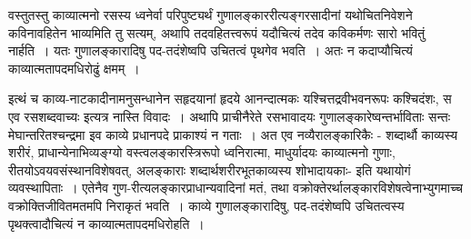 {वस्तुतस्तु काव्यात्मनो रसस्य ध्वनेर्वा परिपुष्ट्यर्थं गुणालङ्काररीत्यङ्गरसादीनां यथोचितनिवेशने कविनावहितेन भाव्यमिति तु सत्यम्, अथापि तदवहितत्त्वरूपं यदौचित्यं तदेव कविकर्मणः सारो भवितुं नार्हति~। यतः गुणालङ्कारादिषु पद-तदंशेष्वपि उचितत्वं पृथगेव भवति~। अतः न कदाप्यौचित्यं काव्यात्मतापदमधिरोढुं क्षमम्~। 

इत्थं च काव्य-नाटकादीनामनुसन्धानेन सहृदयानां हृदये आनन्दात्मकः यश्चित्तद्रवीभवनरूपः कश्चिदंशः, स एव रसशब्दवाच्यः इत्यत्र नास्ति विवादः~। अथापि प्राचीनैरेते  रसभावादयः गुणालङ्कारेष्वन्तर्भाविताः सन्तः मेघान्तरितश्चन्द्रमा  इव काव्ये प्रधानपदे प्राकाश्यं न गताः~। अत एव नव्यैरालङ्कारिकैः  - शब्दार्थौ काव्यस्य शरीरं, प्राधान्येनाभिव्यङ्ग्यो वस्त्वलङ्कारस्त्रिरूपो ध्वनिरात्मा, माधुर्यादयः काव्यात्मनो गुणाः, रीतयोऽवयवसंस्थानविशेषवत्, अलङ्काराः शब्दार्थशरीरभूतकाव्यस्य शोभादायकाः- इति यथायोगं व्यवस्थापिताः~। एतेनैव गुण-रीत्यलङ्कारप्राधान्यवादिनां मतं, तथा वक्रोक्तेरर्थालङ्कारविशेषत्वेनाभ्युगमाच्च वक्रोक्तिजीवितमतमपि निराकृतं भवति~। काव्ये गुणालङ्कारादिषु, पद-तदंशेष्वपि उचितत्वस्य पृथक्त्वादौचित्यं न काव्यात्मतापदमधिरोहति~। 

\articleend
}
